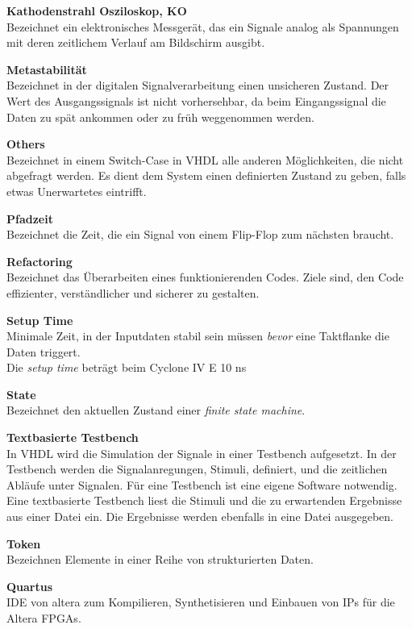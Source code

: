\textbf{Kathodenstrahl Osziloskop, KO}\\
Bezeichnet ein elektronisches Messgerät, das ein Signale analog als Spannungen mit deren zeitlichem Verlauf am Bildschirm ausgibt.

\textbf{Metastabilität}\\
Bezeichnet in der  digitalen Signalverarbeitung einen unsicheren Zustand. Der Wert des Ausgangssignals ist nicht vorhersehbar, da beim Eingangssignal die Daten zu spät ankommen oder zu früh weggenommen werden.

\textbf{Others}\\
Bezeichnet in einem Switch-Case in VHDL alle anderen Möglichkeiten, die nicht abgefragt werden. Es dient dem System einen definierten Zustand zu geben, falls etwas Unerwartetes eintrifft.

\textbf{Pfadzeit}\\
Bezeichnet die Zeit, die ein Signal von einem Flip-Flop zum nächsten braucht.

\textbf{Refactoring}\\
Bezeichnet das Überarbeiten eines funktionierenden Codes. Ziele sind, den Code effizienter, verständlicher und sicherer zu gestalten.

\textbf{Setup Time} \\
Minimale Zeit, in der Inputdaten stabil sein müssen \textit{bevor} eine Taktflanke die Daten triggert.\\
Die \textit{setup time} beträgt beim Cyclone IV E 10 ns \cite{Handbook_Altera}

\textbf{State}\\
Bezeichnet den aktuellen Zustand einer \textit{finite state machine}.

\textbf{Textbasierte Testbench}\\
In VHDL wird die Simulation der Signale in einer Testbench aufgesetzt. In der Testbench werden die Signalanregungen, Stimuli, definiert, und die zeitlichen Abläufe unter Signalen. Für eine Testbench ist eine eigene Software notwendig.\\
Eine textbasierte Testbench liest die Stimuli und die zu erwartenden Ergebnisse aus einer Datei ein. Die Ergebnisse werden ebenfalls in eine Datei ausgegeben.

\textbf{Token}\\
Bezeichnen Elemente in einer Reihe von strukturierten Daten.

\textbf{Quartus}\\
IDE von altera zum Kompilieren, Synthetisieren und Einbauen von IPs für die Altera FPGAs.
